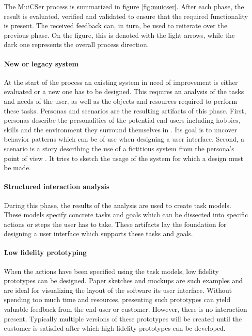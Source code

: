         The MuiCSer process is summarized in figure \ref{fig:muicser}. After each phase, the result is evaluated, verified and validated to ensure that the required functionality is present. The received feedback can, in turn, be used to reiterate over the previous phase. On the figure, this is denoted with the light arrows, while the dark one represents the overall process direction.

        \paragraph{New or legacy system} At the start of the process an existing system in need of improvement is either evaluated or a new one has to be designed. This requires an analysis of the tasks and needs of the user, as well as the objects and resources required to perform these tasks. Personas and scenarios are the resulting artifacts of this phase. First, personas describe the personalities of the potential end users including hobbies, skills and the environment they surround themselves in \cite{persona_scenario}. Its goal is to uncover behavior patterns which can be of use when designing a user interface. Second, a scenario is a story describing the use of a fictitious system from the persona's point of view \cite{persona_scenario}. It tries to sketch the usage of the system for which a design must be made.

        \paragraph{Structured interaction analysis} During this phase, the results of the analysis are used to create task models. These models specify concrete tasks and goals which can be dissected into specific actions or steps the user has to take. These artifacts lay the foundation for designing a user interface which supports these tasks and goals.

        \paragraph{Low fidelity prototyping} When the actions have been specified using the task models, low fidelity prototypes can be designed. Paper sketches and mockups are such examples and are ideal for visualizing the layout of the software its user interface. Without spending too much time and resources, presenting such prototypes can yield valuable feedback from the end-user or customer. However, there is no interaction present. Typically multiple versions of these prototypes will be created until the customer is satisfied after which high fidelity prototypes can be developed.

